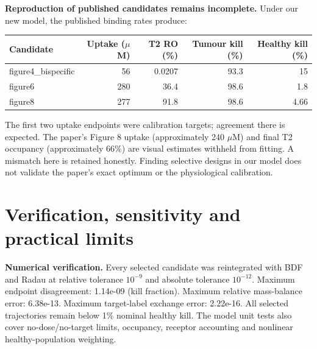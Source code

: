 \documentclass[10pt,a4paper]{article}
\begin{document}
\textbf{Reproduction of published candidates remains incomplete.} Under our new model, the published binding rates produce:
\begin{center}\small\begin{tabular}{lrrrr}\toprule
Candidate & Uptake ($\mu$M) & T2 RO (\%) & Tumour kill (\%) & Healthy kill (\%)\\\midrule
figure4\_bispecific & 56 & 0.0207 & 93.3 & 15 \\
figure6 & 280 & 36.4 & 98.6 & 1.8 \\
figure8 & 277 & 91.8 & 98.6 & 4.66 \\
\bottomrule\end{tabular}\end{center}
The first two uptake endpoints were calibration targets; agreement there is expected. The paper's Figure 8 uptake (approximately 240 $\mu$M) and final T2 occupancy (approximately 66\%) are visual estimates withheld from fitting. A mismatch here is retained honestly. Finding selective designs in our model does not validate the paper's exact optimum or the physiological calibration.
\newpage
\section*{Verification, sensitivity and practical limits}
\textbf{Numerical verification.} Every selected candidate was reintegrated with BDF and Radau at relative tolerance $10^{-9}$ and absolute tolerance $10^{-12}$. Maximum endpoint disagreement: 1.14e-09 (kill fraction). Maximum relative mass-balance error: 6.38e-13. Maximum target-label exchange error: 2.22e-16. All selected trajectories remain below 1\% nominal healthy kill. The model unit tests also cover no-dose/no-target limits, occupancy, receptor accounting and nonlinear healthy-population weighting.
\end{document}
